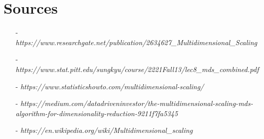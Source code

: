 \documentclass[12pt]{article}
\begin{document}
\section*{Sources}
\begin{itemize}
    \item[-] \textit{https://www.researchgate.net/publication/2634627\_Multidimensional\_Scaling}
    \item[-] \textit{https://www.stat.pitt.edu/sungkyu/course/2221Fall13/lec8\_mds\_combined.pdf}
    \item[-] \textit{https://www.statisticshowto.com/multidimensional-scaling/}
    \item[-] \textit{https://medium.com/datadriveninvestor/the-multidimensional-scaling-mds-algorithm-for-dimensionality-reduction-9211f7fa5345}
    \item[-] \textit{https://en.wikipedia.org/wiki/Multidimensional\_scaling}
\end{itemize}
\end{document}
